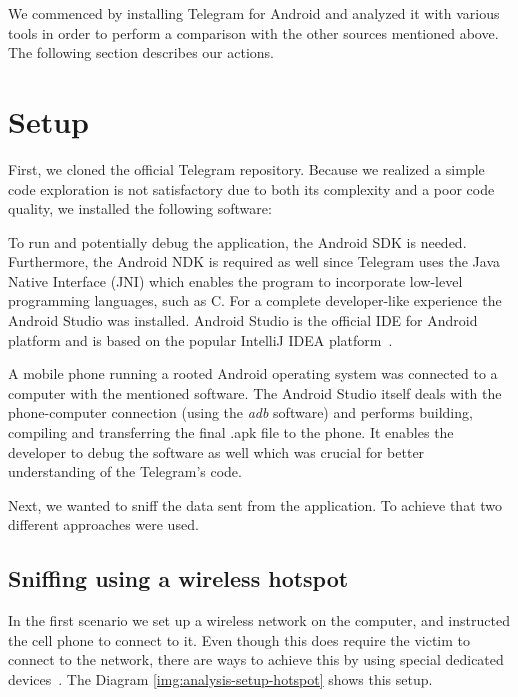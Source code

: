 \documentclass[thesis=M,english]{FITthesis}[2012/10/20]
\begin{document}
We commenced by installing Telegram for Android and analyzed it with various tools in order to perform a comparison with the other sources mentioned above. The following section describes our actions.

\section{Setup}\label{analysis-setup}

First, we cloned the official Telegram repository. Because we realized a simple code exploration is not satisfactory due to both its complexity and a poor code quality, we installed the following software:

To run and potentially debug the application, the Android SDK is needed. Furthermore, the Android NDK is required as well since Telegram uses the Java Native Interface (JNI) which enables the program to incorporate low-level programming languages, such as C. For a complete developer-like experience the Android Studio was installed. Android Studio is the official IDE for Android platform and is based on the popular IntelliJ IDEA platform~\cite{android-studio}.

A mobile phone running a rooted Android operating system was connected to a computer with the mentioned software. The Android Studio itself deals with the phone-computer connection (using the \emph{adb} software) and performs building, compiling and transferring the final .apk file to the phone. It enables the developer to debug the software as well which was crucial for better understanding of the Telegram's code.

Next, we wanted to sniff the data sent from the application. To achieve that two different approaches were used.

\subsection{Sniffing using a wireless hotspot}

In the first scenario we set up a wireless network on the computer, and instructed the cell phone to connect to it. Even though this does require the victim to connect to the network, there are ways to achieve this by using special dedicated devices~\cite{pineapple}. The Diagram \ref{img:analysis-setup-hotspot} shows this setup.
\end{document}
